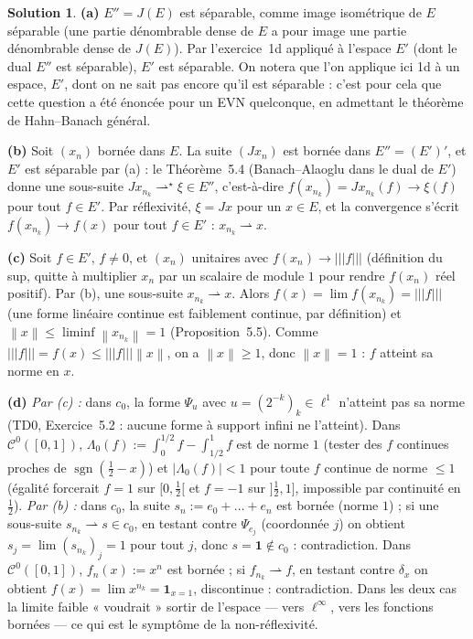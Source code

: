 \documentclass[11pt,a4paper]{article}
\newcommand{\norm}[1]{\left\|#1\right\|}
\newcommand{\opnorm}[1]{|\!|\!|#1|\!|\!|}
\newcommand{\Cz}{\mathcal{C}^0}
\newcommand{\ie}{c'est-à-dire}
\newcommand{\wk}{\rightharpoonup}
\newcommand{\wks}{\rightharpoonup^{\!\star}}
\DeclareMathOperator{\sgn}{sgn}
\theoremstyle{definition}
\newtheorem*{solution}{Solution}
\begin{document}
\begin{solution}
\noindent\textbf{(a)} $E''=J(E)$ est séparable, comme image isométrique de $E$ séparable (une partie dénombrable dense de $E$ a pour image une partie dénombrable dense de $J(E)$). Par l'exercice~1d appliqué à l'espace $E'$ (dont le dual $E''$ est séparable), $E'$ est séparable. On notera que l'on applique ici 1d à un espace, $E'$, dont on ne sait pas encore qu'il est séparable : c'est pour cela que cette question a été énoncée pour un EVN quelconque, en admettant le théorème de Hahn--Banach général.

\medskip
\noindent\textbf{(b)} Soit $(x_n)$ bornée dans $E$. La suite $(Jx_n)$ est bornée dans $E''=(E')'$, et $E'$ est séparable par (a) : le Théorème~5.4 (Banach--Alaoglu dans le dual de $E'$) donne une sous-suite $Jx_{n_k}\wks\xi\in E''$, \ie{} $f(x_{n_k})=Jx_{n_k}(f)\to\xi(f)$ pour tout $f\in E'$. Par réflexivité, $\xi=Jx$ pour un $x\in E$, et la convergence s'écrit $f(x_{n_k})\to f(x)$ pour tout $f\in E'$ : $x_{n_k}\wk x$.

\medskip
\noindent\textbf{(c)} Soit $f\in E'$, $f\ne0$, et $(x_n)$ unitaires avec $f(x_n)\to\opnorm f$ (définition du sup, quitte à multiplier $x_n$ par un scalaire de module $1$ pour rendre $f(x_n)$ réel positif). Par (b), une sous-suite $x_{n_k}\wk x$. Alors $f(x)=\lim f(x_{n_k})=\opnorm f$ (une forme linéaire continue est faiblement continue, par définition) et $\norm x\le\liminf\norm{x_{n_k}}=1$ (Proposition~5.5). Comme $\opnorm f=f(x)\le\opnorm f\norm x$, on a $\norm x\ge1$, donc $\norm x=1$ : $f$ atteint sa norme en $x$.

\medskip
\noindent\textbf{(d)} \emph{Par (c) :} dans $c_0$, la forme $\Psi_u$ avec $u=(2^{-k})_k\in\ell^1$ n'atteint pas sa norme (TD0, Exercice~5.2 : aucune forme à support infini ne l'atteint). Dans $\Cz([0,1])$, $\Lambda_0(f):=\int_0^{1/2}f-\int_{1/2}^1f$ est de norme $1$ (tester des $f$ continues proches de $\sgn(\frac12-x)$) et $|\Lambda_0(f)|<1$ pour toute $f$ continue de norme $\le1$ (égalité forcerait $f=1$ sur $[0,\frac12[$ et $f=-1$ sur $]\frac12,1]$, impossible par continuité en $\frac12$). \emph{Par (b) :} dans $c_0$, la suite $s_n:=e_0+\dots+e_n$ est bornée (norme $1$) ; si une sous-suite $s_{n_k}\wk s\in c_0$, en testant contre $\Psi_{e_j}$ (coordonnée $j$) on obtient $s_j=\lim(s_{n_k})_j=1$ pour tout $j$, donc $s=\mathbf 1\notin c_0$ : contradiction. Dans $\Cz([0,1])$, $f_n(x):=x^n$ est bornée ; si $f_{n_k}\wk f$, en testant contre $\delta_x$ on obtient $f(x)=\lim x^{n_k}=\mathbf 1_{x=1}$, discontinue : contradiction. Dans les deux cas la limite faible « voudrait » sortir de l'espace — vers $\ell^\infty$, vers les fonctions bornées — ce qui est le symptôme de la non-réflexivité.


\end{solution}
\end{document}
